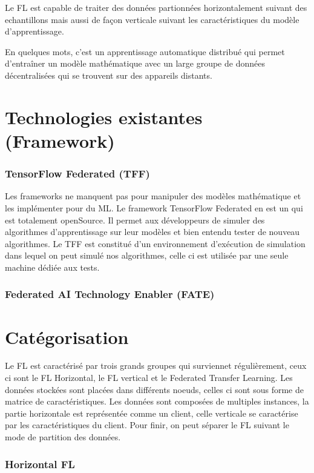 \documentclass[12pt,a4paper]{report}
\begin{document}
Le FL est capable de traiter des données partionnées horizontalement suivant des echantillons mais aussi de façon verticale suivant les caractéristiques du modèle d'apprentissage.

En quelques mots, c'est un apprentissage automatique distribué qui permet d'entraîner un modèle mathématique avec un large groupe de données décentralisées qui se trouvent sur des appareils distants. 

\pagebreak

\chapter{Technologies existantes (Framework)}
\subsection{TensorFlow Federated (TFF)}

Les frameworks ne manquent pas pour manipuler des modèles mathématique et les implémenter pour du ML. Le framework TensorFlow Federated en est un qui est totalement openSource. Il permet aux développeurs de simuler des algorithmes d'apprentissage sur leur modèles et bien entendu tester de nouveau algorithmes. Le TFF est constitué d'un environnement d'exécution de simulation dans lequel on peut simulé nos algorithmes, celle ci est utilisée par une seule machine dédiée aux tests.

\subsection{Federated AI Technology Enabler (FATE)}

\chapter{Catégorisation}

Le FL est caractérisé par trois grands groupes qui surviennet régulièrement, ceux ci sont le FL Horizontal, le FL vertical et le Federated Transfer Learning. Les données stockées sont placées dans différents noeuds, celles ci sont sous forme de matrice de caractéristiques. Les données sont composées de multiples instances, la partie horizontale est représentée comme un client, celle verticale se caractérise par les caractéristiques du client. Pour finir, on peut séparer le FL suivant le mode de partition des données.\\

\subsection{Horizontal FL}
\end{document}
